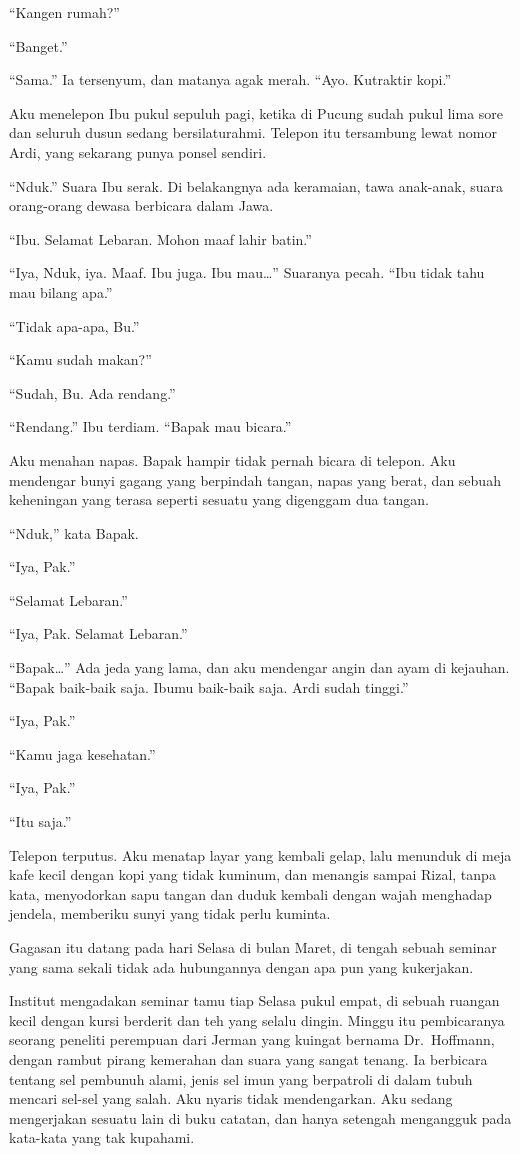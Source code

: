 \documentclass[11pt,twoside,openany]{book}
\makeatletter
\newcommand{\scenebreak}{\par\vspace{0.9em}{\centering\textsc{*\hspace{0.7em}*\hspace{0.7em}*}\par}\vspace{0.9em}\@afterindentfalse\@afterheading}
\makeatother
\begin{document}
``Kangen rumah?''

``Banget.''

``Sama.'' Ia tersenyum, dan matanya agak merah. ``Ayo. Kutraktir kopi.''

Aku menelepon Ibu pukul sepuluh pagi, ketika di Pucung sudah pukul lima sore dan seluruh dusun sedang bersilaturahmi. Telepon itu tersambung lewat nomor Ardi, yang sekarang punya ponsel sendiri.

``Nduk.'' Suara Ibu serak. Di belakangnya ada keramaian, tawa anak-anak, suara orang-orang dewasa berbicara dalam Jawa.

``Ibu. Selamat Lebaran. Mohon maaf lahir batin.''

``Iya, Nduk, iya. Maaf. Ibu juga. Ibu mau\ldots{}'' Suaranya pecah. ``Ibu tidak tahu mau bilang apa.''

``Tidak apa-apa, Bu.''

``Kamu sudah makan?''

``Sudah, Bu. Ada rendang.''

``Rendang.'' Ibu terdiam. ``Bapak mau bicara.''

Aku menahan napas. Bapak hampir tidak pernah bicara di telepon. Aku mendengar bunyi gagang yang berpindah tangan, napas yang berat, dan sebuah keheningan yang terasa seperti sesuatu yang digenggam dua tangan.

``Nduk,'' kata Bapak.

``Iya, Pak.''

``Selamat Lebaran.''

``Iya, Pak. Selamat Lebaran.''

``Bapak\ldots{}'' Ada jeda yang lama, dan aku mendengar angin dan ayam di kejauhan. ``Bapak baik-baik saja. Ibumu baik-baik saja. Ardi sudah tinggi.''

``Iya, Pak.''

``Kamu jaga kesehatan.''

``Iya, Pak.''

``Itu saja.''

Telepon terputus. Aku menatap layar yang kembali gelap, lalu menunduk di meja kafe kecil dengan kopi yang tidak kuminum, dan menangis sampai Rizal, tanpa kata, menyodorkan sapu tangan dan duduk kembali dengan wajah menghadap jendela, memberiku sunyi yang tidak perlu kuminta.

\scenebreak
Gagasan itu datang pada hari Selasa di bulan Maret, di tengah sebuah seminar yang sama sekali tidak ada hubungannya dengan apa pun yang kukerjakan.

Institut mengadakan seminar tamu tiap Selasa pukul empat, di sebuah ruangan kecil dengan kursi berderit dan teh yang selalu dingin. Minggu itu pembicaranya seorang peneliti perempuan dari Jerman yang kuingat bernama Dr.~Hoffmann, dengan rambut pirang kemerahan dan suara yang sangat tenang. Ia berbicara tentang sel pembunuh alami, jenis sel imun yang berpatroli di dalam tubuh mencari sel-sel yang salah. Aku nyaris tidak mendengarkan. Aku sedang mengerjakan sesuatu lain di buku catatan, dan hanya setengah mengangguk pada kata-kata yang tak kupahami.
\end{document}

